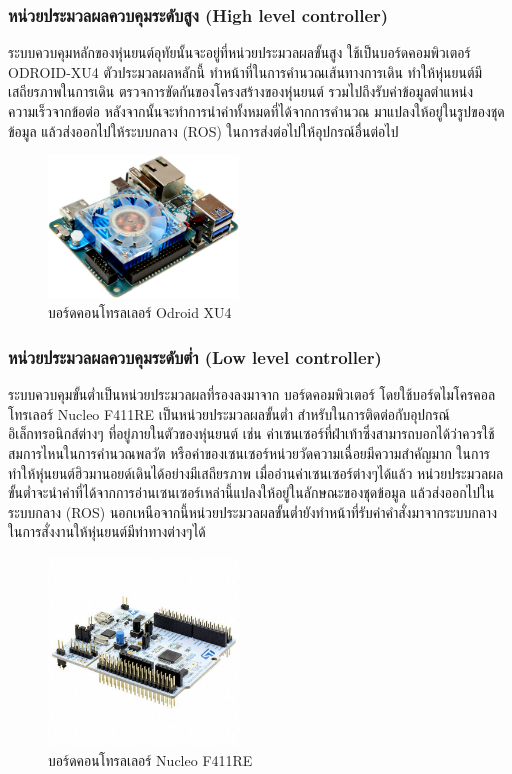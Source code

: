 \clearpage
\subsubsection{หน่วยประมวลผลควบคุมระดับสูง (High level controller)}
ระบบควบคุมหลักของหุ่นยนต์อุทัยนั้นจะอยู่ที่หน่วยประมวลผลขั้นสูง ใช้เป็นบอร์ดคอมพิวเตอร์ ODROID-XU4 ตัวประมวลผลหลักนี้
ทำหน้าที่ในการคำนวณเส้นทางการเดิน ทำให้หุ่นยนต์มีเสถียรภาพในการเดิน ตรวจการขัดกันของโครงสร้างของหุ่นยนต์
รวมไปถึงรับค่าข้อมูลตำแหน่ง ความเร็วจากข้อต่อ หลังจากนั้นจะทำการนำค่าทั้งหมดที่ได้จากการคำนวณ
มาแปลงให้อยู่ในรูปของชุดข้อมูล แล้วส่งออกไปให้ระบบกลาง (ROS) ในการส่งต่อไปให้อุปกรณ์อื่นต่อไป

\begin{figure}[ht]
	\centering
	\includegraphics[width=0.45\textwidth]{chapter3/images/odroid_xu4.jpeg}
	\caption{บอร์ดคอนโทรลเลอร์ Odroid XU4}
	\label{fig:controller_xu4}
\end{figure}

\subsubsection{หน่วยประมวลผลควบคุมระดับต่ำ (Low level controller)}
ระบบควบคุมขั้นต่ำเป็นหน่วยประมวลผลที่รองลงมาจาก บอร์ดคอมพิวเตอร์ โดยใช้บอร์ดไมโครคอลโทรเลอร์ Nucleo F411RE
เป็นหน่วยประมวลผลขั้นต่ำ สำหรับในการติดต่อกับอุปกรณ์อิเล็กทรอนิกส์ต่างๆ ที่อยู่ภายในตัวของหุ่นยนต์ เช่น
ค่าเซนเซอร์ที่ฝ่าเท้าซึ่งสามารถบอกได้ว่าควรใช้สมการไหนในการคำนวณพลวัต หรือค่าของเซนเซอร์หน่วยวัดความเฉื่อยมีความสำคัญมาก
ในการทำให้หุ่นยนต์ฮิวมานอยด์เดินได้อย่างมีเสถียรภาพ เมื่ออ่านค่าเซนเซอร์ต่างๆได้แล้ว
หน่วยประมวลผลขั้นต่ำจะนำค่าที่ได้จากการอ่านเซนเซอร์เหล่านี้แปลงให้อยู่ในลักษณะของชุดข้อมูล แล้วส่งออกไปในระบบกลาง (ROS)
นอกเหนือจากนี้หน่วยประมวลผลขั้นต่ำยังทำหน้าที่รับค่าคำสั่งมาจากระบบกลาง ในการสั่งงานให้หุ่นยนต์มีท่าทางต่างๆได้

\begin{figure}[ht]
	\centering
	\includegraphics[width=0.45\textwidth]{chapter3/images/nucleo_f411re.jpeg}
	\caption{บอร์ดคอนโทรลเลอร์ Nucleo F411RE}
	\label{fig:controller_f411re}
\end{figure}


